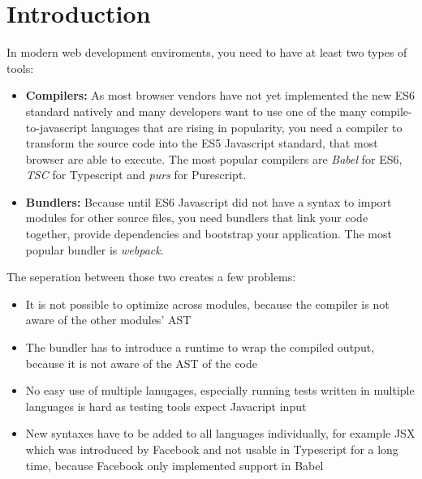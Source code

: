 \section{Introduction}

In modern web development enviroments, you need to have at least two types of tools:

\begin{itemize}

\item{\textbf{Compilers:} As most browser vendors have not yet implemented the new ES6 standard natively and many developers want to use one of the many compile-to-javascript languages that are rising in popularity, you need a compiler to transform the source code into the ES5 Javascript standard, that most browser are able to execute. The most popular compilers are \textit{Babel} for ES6, \textit{TSC} for Typescript and \textit{purs} for Purescript.}

\item{\textbf{Bundlers:} Because until ES6 Javascript did not have a syntax to import modules for other source files, you need bundlers that link your code together, provide dependencies and bootstrap your application. The most popular bundler is \textit{webpack}.}

\end{itemize}

\newpage

The seperation between those two creates a few problems:

\begin{itemize}
\item{It is not possible to optimize across modules, because the compiler is not aware of the other modules' AST}

\item{The bundler has to introduce a runtime to wrap the compiled output, because it is not aware of the AST of the code}

\item{No easy use of multiple lanugages, especially running tests written in multiple languages is hard as testing tools expect Javacript input}

\item{New syntaxes have to be added to all languages individually, for example JSX which was introduced by Facebook and not usable in Typescript for a long time, because Facebook only implemented support in Babel}

\end{itemize}

